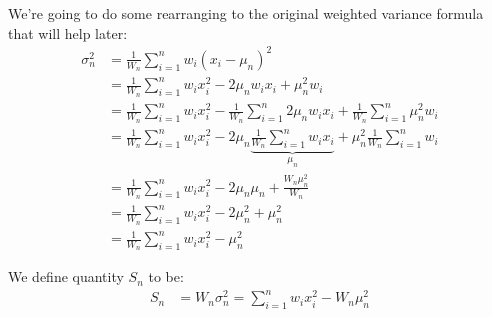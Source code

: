 \documentclass[english,12pt]{article}
\theoremstyle{plain}
\theoremstyle{definition}
\theoremstyle{definition} %
\begin{document}
We're going to do some rearranging to the original weighted variance formula that will help later:
\begin{align*}
\sigma_n^2 &=\frac{1}{W_n}\sum_{i=1}^n w_i(x_i - \mu_n)^2\\
&=\frac{1}{W_n}\sum_{i=1}^n w_ix_i^2 - 2\mu_nw_ix_i + \mu_n^2w_i\\
&=\frac{1}{W_n}\sum_{i=1}^n w_ix_i^2 - \frac{1}{W_n}\sum_{i=1}^n2\mu_nw_ix_i + \frac{1}{W_n}\sum_{i=1}^n\mu_n^2w_i\\
&=\frac{1}{W_n}\sum_{i=1}^n w_ix_i^2 - 2\mu_n\underbrace{\frac{1}{W_n}\sum_{i=1}^nw_ix_i}_{\mu_n} + \mu_n^2\frac{1}{W_n}\sum_{i=1}^nw_i\\
&=\frac{1}{W_n}\sum_{i=1}^n w_ix_i^2 - 2\mu_n\mu_n + \frac{W_n\mu_n^2}{W_n}\\
&=\frac{1}{W_n}\sum_{i=1}^n w_ix_i^2 - 2\mu_n^2 + \mu_n^2\\
&=\frac{1}{W_n}\sum_{i=1}^n w_ix_i^2 - \mu_n^2
\end{align*}

We define quantity $S_n$ to be:
\begin{align*}
S_n &= W_n\sigma_n^2
=\sum_{i=1}^n w_ix_i^2 - W_n\mu_n^2
\end{align*}
\end{document}

